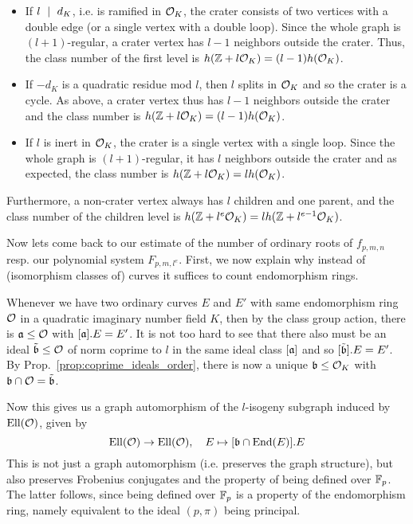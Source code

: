 \begin{itemize}
    \item If $l \ \mid \  d_K$, i.e. is ramified in $\mathcal{O}_K$, the crater consists of two vertices with a double edge (or a single vertex with a double loop).
    Since the whole graph is $(l + 1)$-regular, a crater vertex has $l - 1$ neighbors outside the crater.
    Thus, the class number of the first level is $h(\mathbb{Z} + l\mathcal{O}_K) = (l - 1)h(\mathcal{O}_K)$.
    \item If $-d_K$ is a quadratic residue mod $l$, then $l$ splits in $\mathcal{O}_K$ and so the crater is a cycle.
    As above, a crater vertex thus has $l - 1$ neighbors outside the crater and the class number is $h(\mathbb{Z} + l\mathcal{O}_K) = (l - 1)h(\mathcal{O}_K)$.
    \item If $l$ is inert in $\mathcal{O}_K$, the crater is a single vertex with a single loop.
    Since the whole graph is $(l + 1)$-regular, it has $l$ neighbors outside the crater and as expected, the class number is $h(\mathbb{Z} + l\mathcal{O}_K) = l h(\mathcal{O}_K)$.
\end{itemize}
Furthermore, a non-crater vertex always has $l$ children and one parent, and the class number of the children level is $h(\mathbb{Z} + l^e\mathcal{O}_K) = l h(\mathbb{Z} + l^{e - 1}\mathcal{O}_K)$.

Now lets come back to our estimate of the number of ordinary roots of $f_{p, m, n}$ resp. our polynomial system $F_{p, m, l^e}$.
First, we now explain why instead of (isomorphism classes of) curves it suffices to count endomorphism rings.

Whenever we have two ordinary curves $E$ and $E'$ with same endomorphism ring $\mathcal{O}$ in a quadratic imaginary number field $K$, then by the class group action, there is $\mathfrak{a} \leq \mathcal{O}$ with $[\mathfrak{a}].E = E'$.
It is not too hard to see that there also must be an ideal $\tilde{\mathfrak{b}} \leq \mathcal{O}$ of norm coprime to $l$ in the same ideal class $[\mathfrak{a}]$ and so $[\tilde{\mathfrak{b}}].E = E'$.
By Prop.~\ref{prop:coprime_ideals_order}, there is now a unique $\mathfrak{b} \leq \mathcal{O}_K$ with $\mathfrak{b} \cap \mathcal{O} = \tilde{\mathfrak{b}}$.

Now this gives us a graph automorphism of the $l$-isogeny subgraph induced by $\mathrm{Ell}(\mathcal{O})$, given by
\begin{equation*}
    \mathrm{Ell}(\mathcal{O}) \to \mathrm{Ell}(\mathcal{O}), \quad E \mapsto [\mathfrak{b} \cap \mathrm{End}(E)].E
\end{equation*}
This is not just a graph automorphism (i.e. preserves the graph structure), but also preserves Frobenius conjugates and the property of being defined over $\mathbb{F}_p$.
The latter follows, since being defined over $\mathbb{F}_p$ is a property of the endomorphism ring, namely equivalent to the ideal $(p, \pi)$ being principal.

